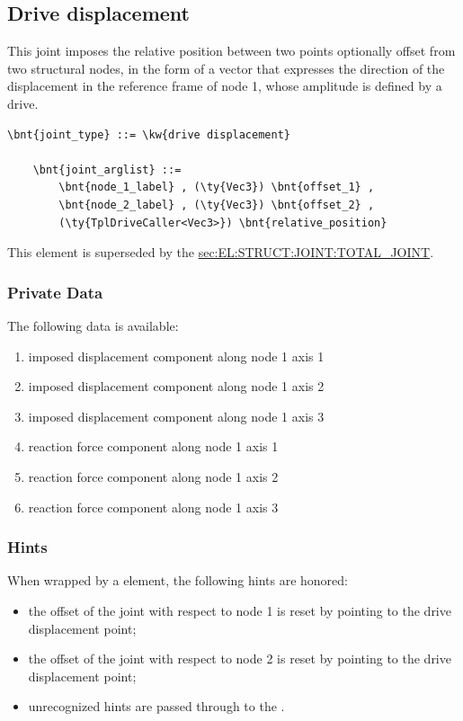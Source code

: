 \subsection{Drive displacement}
\label{sec:EL:JOINT:DRIVEDISPLACEMENT}
This joint imposes the relative position between two points 
optionally offset from two structural nodes,
in the form of a vector that expresses the direction of the displacement
in the reference frame of node 1, whose amplitude is defined by a drive.
\begin{Verbatim}[commandchars=\\\{\}]
    \bnt{joint_type} ::= \kw{drive displacement}

    \bnt{joint_arglist} ::= 
        \bnt{node_1_label} , (\ty{Vec3}) \bnt{offset_1} ,
        \bnt{node_2_label} , (\ty{Vec3}) \bnt{offset_2} ,
        (\ty{TplDriveCaller<Vec3>}) \bnt{relative_position}
\end{Verbatim}
This element is superseded by the
\hyperref{\kw{total joint}}{\kw{total joint}, see Section~}{}{sec:EL:STRUCT:JOINT:TOTAL_JOINT}.

\subsubsection{Private Data}
The following data is available:
\begin{enumerate}
\item {} imposed displacement component along node 1 axis 1
\item {} imposed displacement component along node 1 axis 2
\item {} imposed displacement component along node 1 axis 3
\item {} reaction force component along node 1 axis 1
\item {} reaction force component along node 1 axis 2
\item {} reaction force component along node 1 axis 3
\end{enumerate}

\subsubsection{Hints}
When wrapped by a  element, the following hints are honored:
\begin{itemize}
\item {} the offset of the joint
with respect to node 1 is reset by pointing 
to the drive displacement point;
\item {} the offset of the joint
with respect to node 2 is reset by pointing 
to the drive displacement point;
\item unrecognized hints are passed through to the .
\end{itemize}



